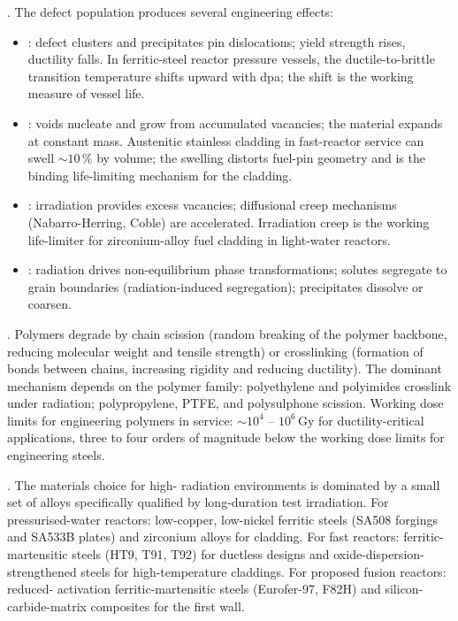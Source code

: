 . The defect population produces
several engineering effects:

\begin{itemize}[leftmargin=*]
\item {}: defect clusters and
  precipitates pin dislocations; yield strength rises, ductility falls.
  In ferritic-steel reactor pressure vessels, the ductile-to-brittle
  transition temperature shifts upward with dpa; the shift is the
  working measure of vessel life.
\item {}: voids nucleate and grow from accumulated
  vacancies; the material expands at constant mass. Austenitic
  stainless cladding in fast-reactor service can swell $\sim 10\,\%$
  by volume; the swelling distorts fuel-pin geometry and is the
  binding life-limiting mechanism for the cladding.
\item {}: irradiation provides excess
  vacancies; diffusional creep mechanisms (Nabarro-Herring, Coble)
  are accelerated. Irradiation creep is the working life-limiter for
  zirconium-alloy fuel cladding in light-water reactors.
\item {}: radiation drives
  non-equilibrium phase transformations; solutes segregate to grain
  boundaries (radiation-induced segregation); precipitates dissolve
  or coarsen.
\end{itemize}

. Polymers degrade by chain
scission (random breaking of the polymer backbone, reducing molecular
weight and tensile strength) or crosslinking (formation of bonds
between chains, increasing rigidity and reducing ductility). The
dominant mechanism depends on the polymer family: polyethylene and
polyimides crosslink under radiation; polypropylene, PTFE, and
polysulphone scission. Working dose limits for engineering polymers
in service: $\sim 10^4$ -- $10^6\,\text{Gy}$ for ductility-critical
applications, three to four orders of magnitude below the working
dose limits for engineering steels.

. The materials choice for high-
radiation environments is dominated by a small set of alloys
specifically qualified by long-duration test irradiation. For
pressurised-water reactors: low-copper, low-nickel ferritic steels
(SA508 forgings and SA533B plates) and zirconium alloys for cladding.
For fast reactors: ferritic-martensitic steels (HT9, T91, T92) for
ductless designs and oxide-dispersion-strengthened steels for
high-temperature claddings. For proposed fusion reactors: reduced-
activation ferritic-martensitic steels (Eurofer-97, F82H) and silicon-
carbide-matrix composites for the first wall.

